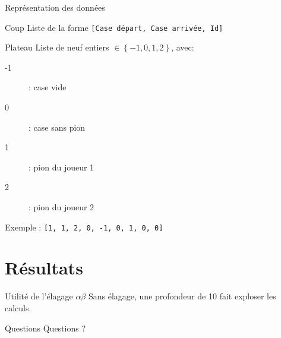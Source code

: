 \documentclass{beamer}
\begin{document}
\begin{frame}{Représentation des données}
    \begin{block}{Coup}
          Liste de la forme \texttt{[Case départ, Case arrivée, Id]}
    \end{block}
    \begin{block}{Plateau}
        Liste de neuf entiers $\in \left\{-1, 0, 1, 2\right\}$, avec:
        \begin{description}
	        \item [-1] : case vide
	        \item [0] : case sans pion
	        \item [1] : pion du joueur 1
	        \item [2] : pion du joueur 2
        \end{description}
        Exemple : \texttt{[1, 1, 2, 0, -1, 0, 1, 0, 0]}
    \end{block}
\end{frame}



\section{Résultats}

\begin{frame}{Utilité de l'élagage $\alpha\beta$}
Sans élagage, une profondeur de 10 fait exploser les calculs.
\end{frame}


\begin{frame}{Questions}
Questions ?
\end{frame}
\end{document}
